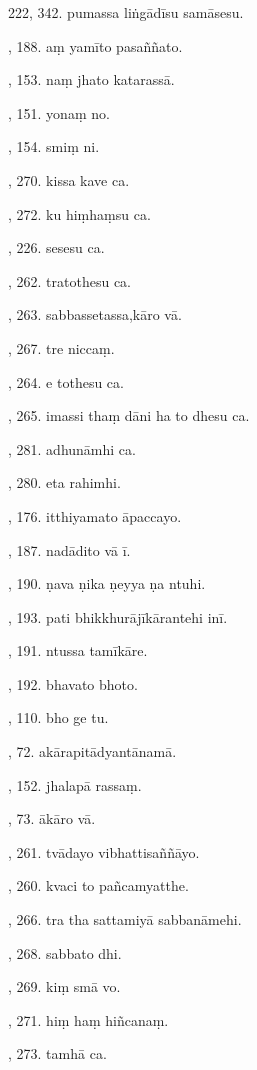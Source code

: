 222, 342. pumassa liṅgādīsu samāsesu.\par {}, 188. aṃ yamīto pasaññato.\par {}, 153. naṃ jhato katarassā.\par {}, 151. yonaṃ no.\par {}, 154. smiṃ ni.\par {}, 270. kissa kave ca.\par {}, 272. ku hiṃhaṃsu ca.\par {}, 226. sesesu ca.\par {}, 262. tratothesu ca.\par {}, 263. sabbassetassa,kāro vā.\par {}, 267. tre niccaṃ.\par {}, 264. e tothesu ca.\par {}, 265. imassi thaṃ dāni ha to dhesu ca.\par {}, 281. adhunāmhi ca.\par {}, 280. eta rahimhi.\par {}, 176. itthiyamato āpaccayo.\par {}, 187. nadādito vā ī.\par {}, 190. ṇava ṇika ṇeyya ṇa ntuhi.\par {}, 193. pati bhikkhurājīkārantehi inī.\par {}, 191. ntussa tamīkāre.\par {}, 192. bhavato bhoto.\par {}, 110. bho ge tu.\par {}, 72. akārapitādyantānamā.\par {}, 152. jhalapā rassaṃ.\par {}, 73. ākāro vā.\par {}, 261. tvādayo vibhattisaññāyo.\par {}, 260. kvaci to pañcamyatthe.\par {}, 266. tra tha sattamiyā sabbanāmehi.\par {}, 268. sabbato dhi.\par {}, 269. kiṃ smā vo.\par {}, 271. hiṃ haṃ hiñcanaṃ.\par {}, 273. tamhā ca.\par \noindent
